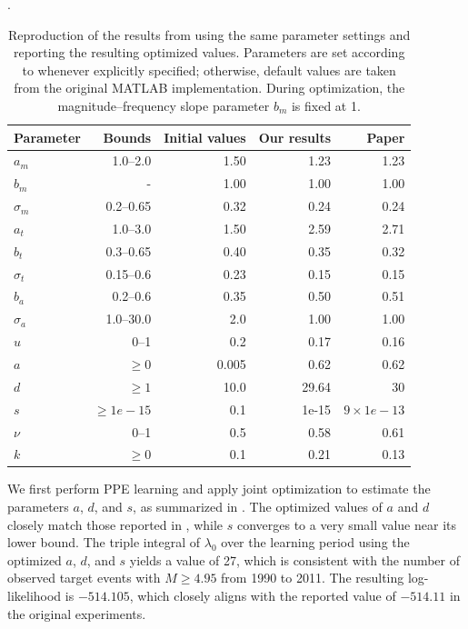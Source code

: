 \documentclass[extra,mreferee]{gji}
\theoremstyle{lemma}
\begin{document}
\begin{table}
\centering
\caption{Reproduction of the results from \cite{2023ER} using the same parameter settings and reporting the resulting optimized values. Parameters are set according to \cite{2023ER} whenever explicitly specified; otherwise, default values are taken from the original MATLAB implementation. During optimization, the magnitude–frequency slope parameter $b_m$ is fixed at 1.} \label{tbl:reproducing}. 
\begin{tabular}{lrrrr}
\toprule
\textbf{Parameter} & \textbf{Bounds} & \textbf{Initial values} & \textbf{Our results} & \textbf{Paper \cite{2023ER}} \\
\midrule
$a_m$         & 1.0--2.0 & 1.50 & 1.23                 & 1.23                    \\
$b_m$         & - & 1.00 & 1.00                  & 1.00                    \\
$\sigma_m$    & 0.2--0.65 & 0.32 & 0.24                  & 0.24                    \\
$a_t$         & 1.0--3.0 & 1.50 & 2.59                 & 2.71                    \\
$b_t$         & 0.3--0.65 & 0.40 & 0.35                  & 0.32                    \\
$\sigma_t$    & 0.15--0.6 & 0.23 & 0.15                  & 0.15                    \\
$b_a$         & 0.2--0.6 & 0.35& 0.50                  & 0.51                    \\
$\sigma_a$    & 1.0--30.0 & 2.0 & 1.00                  & 1.00                    \\
$u$           & 0--1 & 0.2 & 0.17                  & 0.16                    \\
$a$           & $\ge 0$& 0.005 & 0.62                  & 0.62               \\
$d$           & $\ge 1$& 10.0 & 29.64                 & 30                   \\
$s$           & $\ge 1e-15$& 0.1 & 1e-15                  & $9\times1e-13$                   \\
$\nu$           & 0--1& 0.5 & 0.58                  & 0.61                    \\
$k$           & $\ge 0$ & 0.1 & 0.21                  & 0.13	                    \\
\bottomrule
\end{tabular}
\end{table}

We first perform PPE learning and apply joint optimization to estimate the parameters $a$, $d$, and $s$, as summarized in . The optimized values of $a$ and $d$ closely match those reported in \cite{2023ER}, while $s$ converges to a very small value near its lower bound. The triple integral of $\lambda_0$ over the learning period using the optimized $a$, $d$, and $s$ yields a value of 27, which is consistent with the number of observed target events with $M \ge 4.95$ from 1990 to 2011. The resulting log-likelihood is $-514.105$, which closely aligns with the reported value of $-514.11$ in the original experiments.
\end{document}
